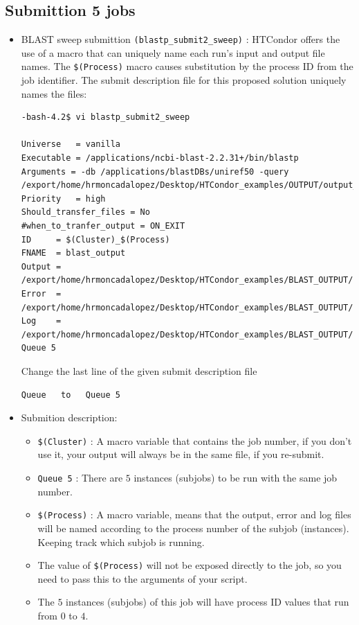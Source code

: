 \documentclass{article}
\begin{document}
\subsection{Submittion 5 jobs}
\begin{itemize}
\item BLAST sweep submittion \verb+(blastp_submit2_sweep)+ : %
HTCondor offers the use of a macro that can uniquely name each run's input and output file names. The \verb+$(Process)+ macro causes substitution by the process ID from
the job identifier. The submit description file for this proposed solution uniquely names the files:
\scriptsize\begin{verbatim}
-bash-4.2$ vi blastp_submit2_sweep

Universe   = vanilla
Executable = /applications/ncbi-blast-2.2.31+/bin/blastp
Arguments = -db /applications/blastDBs/uniref50 -query /export/home/hrmoncadalopez/Desktop/HTCondor_examples/OUTPUT/output_$(Process).txt
Priority   = high
Should_transfer_files = No
#when_to_tranfer_output = ON_EXIT
ID     = $(Cluster)_$(Process)
FNAME  = blast_output
Output = /export/home/hrmoncadalopez/Desktop/HTCondor_examples/BLAST_OUTPUT/$(FNAME)_$(ID).out
Error  = /export/home/hrmoncadalopez/Desktop/HTCondor_examples/BLAST_OUTPUT/$(FNAME)_$(ID).err
Log    = /export/home/hrmoncadalopez/Desktop/HTCondor_examples/BLAST_OUTPUT/$(FNAME)_$(ID).log
Queue 5
\end{verbatim}
\normalsize
Change the last line of the given submit description file
\footnotesize
\begin{verbatim}
Queue   to   Queue 5
\end{verbatim}
\normalsize
\item Submition description:
\begin{itemize}
\item  \verb+$(Cluster)+ : A macro variable that contains the job number, if you don't use it, your output will always be in the same file, if you re-submit.
\item \verb+Queue 5+  : There are $5$ instances (subjobs) to be run with the same job number.
\item \verb+$(Process)+ : A macro variable, means that the output, error and log files will be named according to the process number of the subjob (instances).
Keeping track which subjob is running. 
\item The value of \verb+$(Process)+ will not be exposed directly to the job, so you need to pass this to the arguments of your script.
\item The $5$ instances (subjobs) of this job will have process ID values that run from $0$ to $4$. 

\end{itemize}
\end{itemize}
\end{document}
